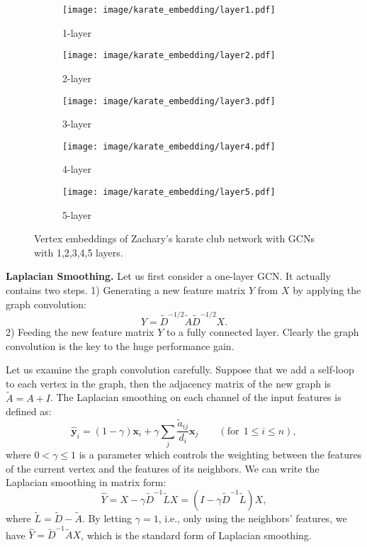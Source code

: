 \documentclass[letterpaper]{article} \usepackage{aaai18}  \usepackage{times}  \usepackage{helvet}  \usepackage{courier}  \usepackage{url}  \usepackage{graphicx}  \usepackage{algorithm}
\begin{document}
\begin{figure*}[ht!]
\centering
\begin{subfigure}{.2\linewidth}
  \centering
  \texttt{[image: image/karate\_embedding/layer1.pdf]}
  \caption{1-layer}
  \label{fig:sub1}
\end{subfigure}\begin{subfigure}{.2\linewidth}
  \centering
  \texttt{[image: image/karate\_embedding/layer2.pdf]}
  \caption{2-layer}
  \label{fig:sub2}
\end{subfigure}\begin{subfigure}{.2\linewidth}
  \centering
  \texttt{[image: image/karate\_embedding/layer3.pdf]}
  \caption{3-layer}
  \label{fig:sub3}
\end{subfigure}\begin{subfigure}{.2\linewidth}
  \centering
  \texttt{[image: image/karate\_embedding/layer4.pdf]}
  \caption{4-layer}
  \label{fig:sub4}
\end{subfigure}\begin{subfigure}{.2\linewidth}
  \centering
  \texttt{[image: image/karate\_embedding/layer5.pdf]}
  \caption{5-layer}
  \label{fig:sub5}
\end{subfigure}\caption{Vertex embeddings of Zachary's karate club network with GCNs with 1,2,3,4,5 layers.}
\label{fig:karate}
\end{figure*}


\textbf{Laplacian Smoothing.} Let us first consider a one-layer GCN. It actually contains two steps. 1) Generating a new feature matrix $Y$ from $X$ by applying the graph convolution:
\begin{equation}
    Y=\tilde{D}^{-1/2}\tilde{A}\tilde{D}^{-1/2}X \label{eq:conv}.
\end{equation}
2) Feeding the new feature matrix $Y$ to a fully connected layer. Clearly the graph convolution is the key to the huge performance gain.

Let us examine the graph convolution carefully. Suppose that we add a self-loop to each vertex in the graph, then the adjacency matrix of the new graph is $\tilde{A}=A+I$. The Laplacian smoothing \cite{taubin1995signal} on each channel of the input features is defined as:
\begin{equation}
    \mathbf{\hat{y}}_i= (1-\gamma)\mathbf{x}_i + \gamma\sum_{j}\frac{\tilde{a}_{ij}}{d_i}\mathbf{x}_j \qquad(\mathrm{for} ~~1\leq i \leq n),
\end{equation}
where $0<\gamma\le1$ is a parameter which controls the weighting between the features of the current vertex and the features of its neighbors. We can write the Laplacian smoothing in matrix form:
\begin{equation}
    \label{eq:Laplacian smoothing}
    \hat{Y}=X-\gamma \tilde{D}^{-1}\tilde{L} X = (I-\gamma\tilde{D}^{-1}\tilde{L})X,
\end{equation}
where $\tilde{L}=\tilde{D}-\tilde{A}$. By letting $\gamma=1$, i.e., only using the neighbors' features, we have $\hat{Y}=\tilde{D}^{-1}\tilde{A}X$, which is the standard form of Laplacian smoothing.
\end{document}
